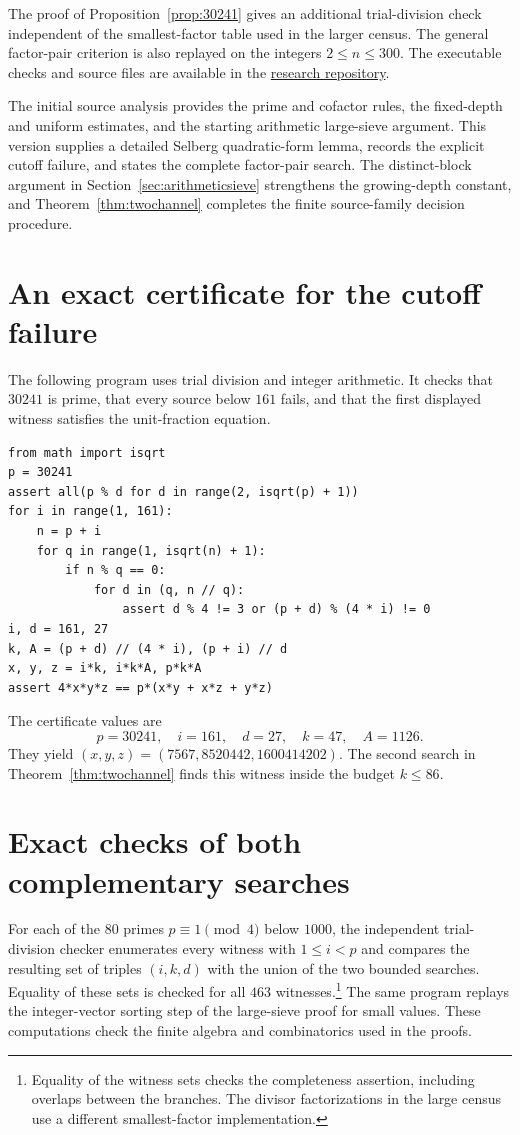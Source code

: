 \documentclass[11pt,a4paper]{amsart}
\theoremstyle{definition}\newtheorem{definition}[theorem]{Definition}
\begin{document}
The proof of Proposition~\ref{prop:30241} gives an additional
trial-division check independent of the smallest-factor table
used in the larger census. The general factor-pair criterion is
also replayed on the integers $2\le n\le300$.
The executable checks and source files are available in the
\href{https://github.com/anaxia-research/ErdosProblem1/tree/main/source-search}{research repository}.

The initial source analysis provides the prime and cofactor rules,
the fixed-depth and uniform estimates, and the starting arithmetic
large-sieve argument. This version supplies a detailed Selberg
quadratic-form lemma, records the explicit cutoff failure, and
states the complete factor-pair search. The distinct-block argument
in Section~\ref{sec:arithmeticsieve} strengthens the growing-depth
constant, and Theorem~\ref{thm:twochannel} completes the finite
source-family decision procedure.


\appendix
\section{An exact certificate for the cutoff failure}\label{app:certificate}
The following program uses trial division and integer arithmetic.
It checks that $30241$ is prime, that every source below $161$
fails, and that the first displayed witness satisfies the
unit-fraction equation.
\begin{verbatim}
from math import isqrt
p = 30241
assert all(p % d for d in range(2, isqrt(p) + 1))
for i in range(1, 161):
    n = p + i
    for q in range(1, isqrt(n) + 1):
        if n % q == 0:
            for d in (q, n // q):
                assert d % 4 != 3 or (p + d) % (4 * i) != 0
i, d = 161, 27
k, A = (p + d) // (4 * i), (p + i) // d
x, y, z = i*k, i*k*A, p*k*A
assert 4*x*y*z == p*(x*y + x*z + y*z)
\end{verbatim}

The certificate values are
\[
 p=30241,\quad i=161,\quad d=27,\quad k=47,\quad A=1126.
\]
They yield $(x,y,z)=(7567,8520442,1600414202)$.
The second search in Theorem~\ref{thm:twochannel} finds this witness
inside the budget $k\le86$.

\section{Exact checks of both complementary searches}\label{app:twochannel}
For each of the $80$ primes $p\equiv1\pmod4$ below $1000$, the
independent trial-division checker enumerates every witness with
$1\le i<p$ and compares the resulting set of triples $(i,k,d)$
with the union of the two bounded searches. Equality of these
sets is checked for all $463$ witnesses.\footnote{Equality of the
witness sets checks the completeness assertion, including overlaps
between the branches. The divisor factorizations in the large
census use a different smallest-factor implementation.}
The same program replays the integer-vector sorting step of
the large-sieve proof for small values. These computations check
the finite algebra and combinatorics used in the proofs.
\end{document}
